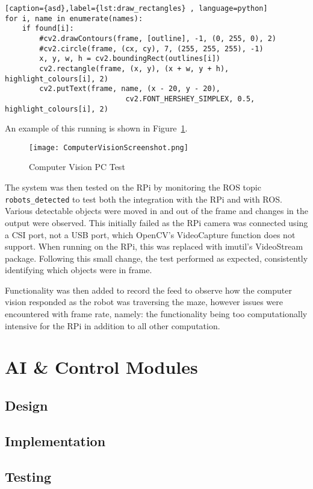 \begin{lstlisting}[caption={asd},label={lst:draw_rectangles} , language=python]
for i, name in enumerate(names):
    if found[i]:
        #cv2.drawContours(frame, [outline], -1, (0, 255, 0), 2)
        #cv2.circle(frame, (cx, cy), 7, (255, 255, 255), -1)
        x, y, w, h = cv2.boundingRect(outlines[i])
        cv2.rectangle(frame, (x, y), (x + w, y + h), highlight_colours[i], 2)
        cv2.putText(frame, name, (x - 20, y - 20),
                            cv2.FONT_HERSHEY_SIMPLEX, 0.5, highlight_colours[i], 2)
\end{lstlisting}

An example of this running is shown in Figure~\ref{fig:cv_screenshot}.

\begin{figure}[!ht]
	\centering
	\texttt{[image: ComputerVisionScreenshot.png]}
	\caption{Computer Vision PC Test}\label{fig:cv_screenshot}

\end{figure}

The system was then tested on the RPi by monitoring the ROS topic \verb|robots_detected| to
test both the integration with the RPi and with ROS. Various detectable objects were moved in
and out of the frame and changes in the output were observed. This initially failed as the RPi
camera was connected using a CSI port, not a USB port, which OpenCV's VideoCapture function
does not support. When running on the RPi, this was replaced with imutil's VideoStream package.
Following this small change, the test performed as expected, consistently identifying which objects were in
frame.

Functionality was then added to record the feed to observe how the computer vision responded as
the robot was traversing the maze, however issues were encountered with frame rate, namely: the functionality being too
computationally intensive for the RPi in addition to all other computation.

\section{AI \& Control Modules}\label{soft/ai}

\subsection{Design}\label{soft/ai/design}

\subsection{Implementation}\label{soft/ai/impl}

\subsection{Testing}\label{soft/ai/test}
